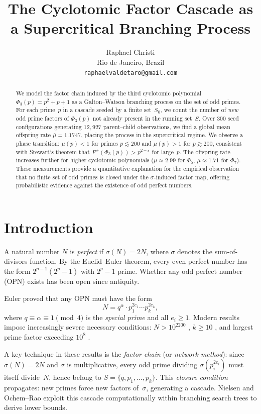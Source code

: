 \documentclass[11pt]{article}
\title{The Cyclotomic Factor Cascade as a Supercritical Branching Process}
\author{Raphael Christi\\
Rio de Janeiro, Brazil\\
\texttt{raphaelvaldetaro@gmail.com}}
\date{}
\theoremstyle{definition}
\theoremstyle{remark}
\newcommand{\Phi}{\varPhi}
\begin{document}
\maketitle

\begin{abstract}
We model the factor chain induced by the third cyclotomic polynomial $\Phi_3(p) = p^2+p+1$
as a Galton--Watson branching process on the set of odd primes. For each prime~$p$ in a cascade
seeded by a finite set~$S_0$, we count the number of \emph{new} odd prime factors of $\Phi_3(p)$
not already present in the running set~$S$. Over $300$ seed configurations generating $12{,}927$
parent--child observations, we find a global mean offspring rate $\bar\mu = 1.1747$, placing the
process in the supercritical regime. We observe a phase transition: $\mu(p) < 1$ for primes
$p \lesssim 200$ and $\mu(p) > 1$ for $p \gtrsim 200$, consistent with Stewart's theorem that
$P^+(\Phi_3(p)) > p^{2-\varepsilon}$ for large~$p$. The offspring rate increases further for higher
cyclotomic polynomials ($\mu \approx 2.99$ for $\Phi_5$, $\mu \approx 1.71$ for $\Phi_7$). These
measurements provide a quantitative explanation for the empirical observation that no finite set
of odd primes is closed under the $\sigma$-induced factor map, offering probabilistic evidence
against the existence of odd perfect numbers.
\end{abstract}

\section{Introduction}

A natural number $N$ is \emph{perfect} if $\sigma(N) = 2N$, where $\sigma$ denotes the sum-of-divisors function. By the Euclid--Euler theorem, every even perfect number has the form $2^{p-1}(2^p - 1)$ with $2^p - 1$ prime. Whether any odd perfect number (OPN) exists has been open since antiquity.

Euler proved that any OPN must have the form
\begin{equation}\label{eq:euler}
N = q^\alpha \cdot p_1^{2e_1} \cdots p_k^{2e_k},
\end{equation}
where $q \equiv \alpha \equiv 1 \pmod{4}$ is the \emph{special prime} and all $e_i \geq 1$. Modern results impose increasingly severe necessary conditions: $N > 10^{2200}$ \cite{OchemRao2012}, $k \geq 10$ \cite{Nielsen2015}, and largest prime factor exceeding $10^8$ \cite{GotoOhno2006}.

A key technique in these results is the \emph{factor chain} (or \emph{network method}): since $\sigma(N) = 2N$ and $\sigma$ is multiplicative, every odd prime dividing $\sigma(p_i^{2e_i})$ must itself divide~$N$, hence belong to $S = \{q, p_1, \ldots, p_k\}$. This \emph{closure condition} propagates: new primes force new factors of~$\sigma$, generating a cascade. Nielsen \cite{Nielsen2007} and Ochem--Rao \cite{OchemRao2012} exploit this cascade computationally within branching search trees to derive lower bounds.
\end{document}
